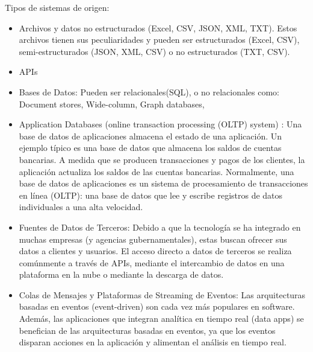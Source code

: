\documentclass[12pt]{book}
\begin{document}
Tipos de sistemas de origen:
\begin{itemize}
    \item Archivos y datos no estructurados (Excel, CSV, JSON, XML, TXT). Estos archivos tienen sus peculiaridades y pueden ser estructurados (Excel, CSV), semi-estructurados (JSON, XML, CSV) o no estructurados (TXT, CSV).
    \item APIs
    \item Bases de Datos: Pueden ser relacionales(SQL), o no relacionales como: Document stores, Wide-column, Graph databases, 
    \item Application Databases (online transaction processing (OLTP) system) : Una base de datos de aplicaciones almacena el estado de una aplicación. Un ejemplo típico es una base de datos que almacena los saldos de cuentas bancarias. A medida que se producen transacciones y pagos de los clientes, la aplicación actualiza los saldos de las cuentas bancarias. Normalmente, una base de datos de aplicaciones es un sistema de procesamiento de transacciones en línea (OLTP): una base de datos que lee y escribe registros de datos individuales a una alta velocidad.
    \item Fuentes de Datos de Terceros: Debido a que la tecnología se ha integrado en muchas empresas (y agencias gubernamentales), estas buscan ofrecer sus datos a clientes y usuarios. El acceso directo a datos de terceros se realiza comúnmente a través de APIs, mediante el intercambio de datos en una plataforma en la nube o mediante la descarga de datos. 
    \item Colas de Mensajes y Plataformas de Streaming de Eventos: Las arquitecturas basadas en eventos (event-driven) son cada vez más populares en software. Además, las aplicaciones que integran analítica en tiempo real (data apps) se benefician de las arquitecturas basadas en eventos, ya que los eventos disparan acciones en la aplicación y alimentan el análisis en tiempo real.
\end{itemize}
\end{document}
